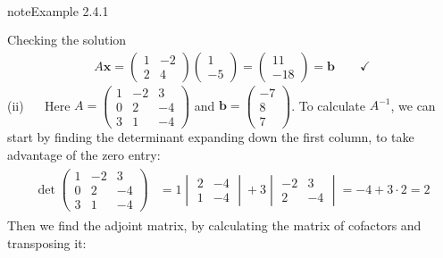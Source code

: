 \documentclass[letterpaper,10pt,english]{jupyterBook}
\begin{document}
\begin{sphinxadmonition}{note}{Example 2.4.1}
\begin{equation*}
\begin{split}
\begin{align*}
\end{align*} \end{split}
\end{equation*}
\sphinxAtStartPar
Checking the solution
\begin{equation*}
\begin{split}A\mathbf{x} = \begin{pmatrix} 1 & -2 \\ 2 & 4 \end{pmatrix} \begin{pmatrix} 1 \\ -5 \end{pmatrix} = \begin{pmatrix}  11 \\  -18    \end{pmatrix}  = \mathbf{b} \qquad \checkmark\end{split}
\end{equation*}
\sphinxAtStartPar
(ii)   Here \(A = \begin{pmatrix} 1 & -2 & 3 \\ 0 & 2 & -4 \\ 3 & 1 & -4 \end{pmatrix}\) and \(\mathbf{b} = \begin{pmatrix}-7 \\ 8 \\ 7 \end{pmatrix}\). To calculate \(A^{-1}\), we can start by finding the determinant \sphinxhyphen{} expanding down the first column, to take advantage of the zero entry:
\begin{equation*}
\begin{split} \begin{align*}
    \det \begin{pmatrix} 1 & -2 & 3 \\ 0 & 2 & -4 \\ 3 & 1 & -4 \end{pmatrix} &=
    1 \begin{vmatrix} 2 & -4 \\ 1 & -4 \end{vmatrix} +
    3 \begin{vmatrix} -2 & 3 \\ 2 & -4 \end{vmatrix} = -4 + 3 \cdot 2 = 2
  \end{align*} 
\end{split}
\end{equation*}
\sphinxAtStartPar
Then we find the adjoint matrix, by calculating the matrix of cofactors and transposing it:

\end{sphinxadmonition}
\end{document}
